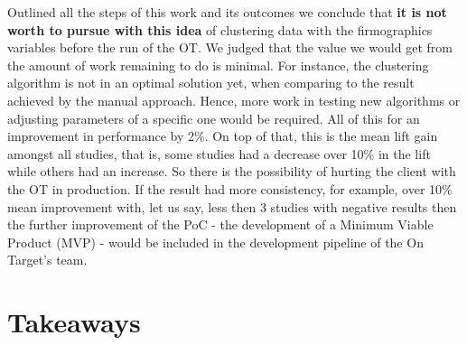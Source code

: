 Outlined all the steps of this work and its outcomes we conclude that \textbf{it is not worth to pursue with this idea} of clustering data with the firmographics variables before the run of the OT. We judged that the value we would get from the amount of work remaining to do is minimal. For instance, the clustering algorithm is not in an optimal solution yet, when comparing to the result achieved by the manual approach. Hence, more work in testing new algorithms or adjusting parameters of a specific one would be required. All of this for an improvement in performance by 2\%. On top of that, this is the mean lift gain amongst all studies, that is, some studies had a decrease over 10\% in the lift while others had an increase. So there is the possibility of hurting the client with the OT in production. If the result had more consistency, for example, over 10\% mean improvement with, let us say, less then 3 studies with negative results then the further improvement of the PoC - the development of a Minimum Viable Product (MVP) - would be included in the development pipeline of the On Target's team. 

\section{Takeaways}

